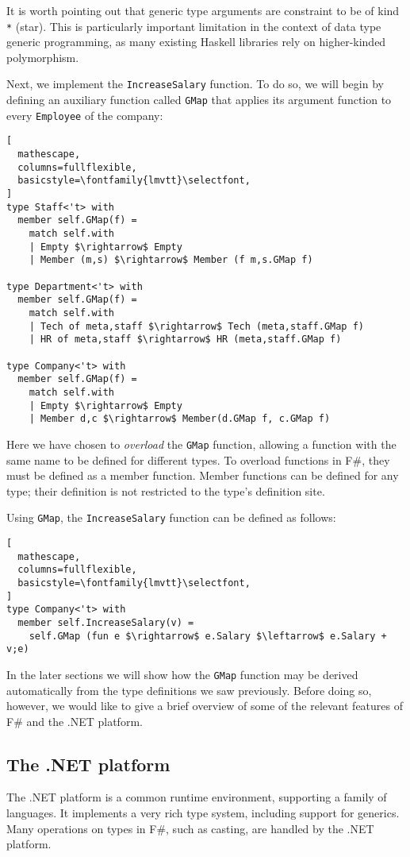 \documentclass{sigplanconf}
\begin{document}
It is worth pointing out that generic type arguments are constraint to
be of kind \verb+*+ (star). This is particularly important limitation
in the context of data type generic programming, as many existing
Haskell libraries rely on higher-kinded polymorphism.

Next, we implement the \verb+IncreaseSalary+ function. To do so, we
will begin by defining an auxiliary function called \verb+GMap+ that
applies its argument function to every \verb+Employee+ of the company:

\begin{lstlisting}[
  mathescape,
  columns=fullflexible,
  basicstyle=\fontfamily{lmvtt}\selectfont,
]
type Staff<'t> with
  member self.GMap(f) = 
    match self.with
    | Empty $\rightarrow$ Empty
    | Member (m,s) $\rightarrow$ Member (f m,s.GMap f)

type Department<'t> with
  member self.GMap(f) =
    match self.with
    | Tech of meta,staff $\rightarrow$ Tech (meta,staff.GMap f)
    | HR of meta,staff $\rightarrow$ HR (meta,staff.GMap f)

type Company<'t> with
  member self.GMap(f) =
    match self.with
    | Empty $\rightarrow$ Empty
    | Member d,c $\rightarrow$ Member(d.GMap f, c.GMap f)
\end{lstlisting}
Here we have chosen to \emph{overload} the \verb+GMap+ function,
allowing a function with the same name to be defined for different
types. To overload functions in F\#, they must be defined as a member
function. Member functions can be defined for any type; their
definition is not restricted to the type's definition site. 

Using \verb+GMap+,  the \verb+IncreaseSalary+ function can be defined as follows:
\begin{lstlisting}[
  mathescape,
  columns=fullflexible,
  basicstyle=\fontfamily{lmvtt}\selectfont,
]
type Company<'t> with
  member self.IncreaseSalary(v) =
    self.GMap (fun e $\rightarrow$ e.Salary $\leftarrow$ e.Salary + v;e)
\end{lstlisting}

In the later sections we will show how the \verb+GMap+ function may be
derived automatically from the type definitions we saw
previously. Before doing so, however, we would like to give a brief
overview of some of the relevant features of F\# and the .NET
platform.

\subsection{The .NET platform}
The .NET platform is a common runtime environment, supporting
a family of languages. It implements a very rich type
system, including support for generics. Many operations on types
in F\#, such as casting, are handled by the .NET platform. 
\end{document}
